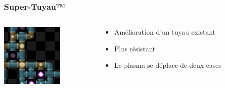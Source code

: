 \documentclass{beamer}
\begin{document}
\begin{frame}
    \frametitle{Super-Tuyau™}
    \begin{columns}[T]
        \begin{column}{.3\textwidth}
            \includegraphics[width=3cm]{pictures/super-tuyau}
        \end{column}
        \begin{column}{.7\textwidth}
            \begin{itemize}
                \item Amélioration d'un tuyau existant
                \item Plus résistant
                \item Le plasma se déplace de deux cases
            \end{itemize}
        \end{column}
    \end{columns}
\end{frame}
\end{document}
